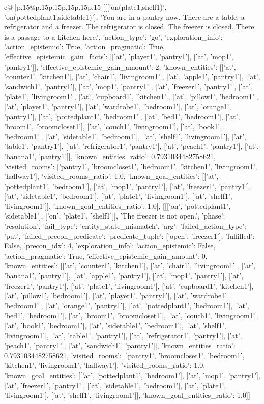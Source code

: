 \documentclass{article}
\begin{document}
{\begin{supertabular}{c@{$\;$}|p{.15\linewidth}@{}p{.15\linewidth}p{.15\linewidth}p{.15\linewidth}p{.15\linewidth}p{.15\linewidth}}
{{{	 [[['on(plate1,shelf1)', 'on(pottedplant1,sidetable1)'], 'You are in a pantry now. There are a table, a refrigerator and a freezer. The refrigerator is closed. The freezer is closed. There is a passage to a kitchen here.', {'action_type': 'go', 'exploration_info': {'action_epistemic': True, 'action_pragmatic': True, 'effective_epistemic_gain_facts': [['at', 'player1', 'pantry1'], ['at', 'mop1', 'pantry1']], 'effective_epistemic_gain_amount': 2, 'known_entities': [['at', 'counter1', 'kitchen1'], ['at', 'chair1', 'livingroom1'], ['at', 'apple1', 'pantry1'], ['at', 'sandwich1', 'pantry1'], ['at', 'mop1', 'pantry1'], ['at', 'freezer1', 'pantry1'], ['at', 'plate1', 'livingroom1'], ['at', 'cupboard1', 'kitchen1'], ['at', 'pillow1', 'bedroom1'], ['at', 'player1', 'pantry1'], ['at', 'wardrobe1', 'bedroom1'], ['at', 'orange1', 'pantry1'], ['at', 'pottedplant1', 'bedroom1'], ['at', 'bed1', 'bedroom1'], ['at', 'broom1', 'broomcloset1'], ['at', 'couch1', 'livingroom1'], ['at', 'book1', 'bedroom1'], ['at', 'sidetable1', 'bedroom1'], ['at', 'shelf1', 'livingroom1'], ['at', 'table1', 'pantry1'], ['at', 'refrigerator1', 'pantry1'], ['at', 'peach1', 'pantry1'], ['at', 'banana1', 'pantry1']], 'known_entities_ratio': 0.7931034482758621, 'visited_rooms': ['pantry1', 'broomcloset1', 'bedroom1', 'kitchen1', 'livingroom1', 'hallway1'], 'visited_rooms_ratio': 1.0, 'known_goal_entities': [['at', 'pottedplant1', 'bedroom1'], ['at', 'mop1', 'pantry1'], ['at', 'freezer1', 'pantry1'], ['at', 'sidetable1', 'bedroom1'], ['at', 'plate1', 'livingroom1'], ['at', 'shelf1', 'livingroom1']], 'known_goal_entities_ratio': 1.0}}], [[['on', 'pottedplant1', 'sidetable1'], ['on', 'plate1', 'shelf1']], 'The freezer is not open.', {'phase': 'resolution', 'fail_type': 'entity_state_mismatch', 'arg': {'failed_action_type': 'put', 'failed_precon_predicate': {'predicate_tuple': ['open', 'freezer1'], 'fulfilled': False, 'precon_idx': 4}}, 'exploration_info': {'action_epistemic': False, 'action_pragmatic': True, 'effective_epistemic_gain_amount': 0, 'known_entities': [['at', 'counter1', 'kitchen1'], ['at', 'chair1', 'livingroom1'], ['at', 'banana1', 'pantry1'], ['at', 'apple1', 'pantry1'], ['at', 'mop1', 'pantry1'], ['at', 'freezer1', 'pantry1'], ['at', 'plate1', 'livingroom1'], ['at', 'cupboard1', 'kitchen1'], ['at', 'pillow1', 'bedroom1'], ['at', 'player1', 'pantry1'], ['at', 'wardrobe1', 'bedroom1'], ['at', 'orange1', 'pantry1'], ['at', 'pottedplant1', 'bedroom1'], ['at', 'bed1', 'bedroom1'], ['at', 'broom1', 'broomcloset1'], ['at', 'couch1', 'livingroom1'], ['at', 'book1', 'bedroom1'], ['at', 'sidetable1', 'bedroom1'], ['at', 'shelf1', 'livingroom1'], ['at', 'table1', 'pantry1'], ['at', 'refrigerator1', 'pantry1'], ['at', 'peach1', 'pantry1'], ['at', 'sandwich1', 'pantry1']], 'known_entities_ratio': 0.7931034482758621, 'visited_rooms': ['pantry1', 'broomcloset1', 'bedroom1', 'kitchen1', 'livingroom1', 'hallway1'], 'visited_rooms_ratio': 1.0, 'known_goal_entities': [['at', 'pottedplant1', 'bedroom1'], ['at', 'mop1', 'pantry1'], ['at', 'freezer1', 'pantry1'], ['at', 'sidetable1', 'bedroom1'], ['at', 'plate1', 'livingroom1'], ['at', 'shelf1', 'livingroom1']], 'known_goal_entities_ratio': 1.0}}]] 
}}}
\end{supertabular}}
\end{document}
